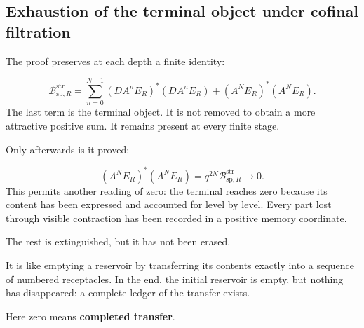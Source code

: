 \subsection{Exhaustion of the terminal object under cofinal filtration}
The proof preserves at each depth a finite identity:\par
\[
\mathcal B_{\mathrm{sp},R}^{\mathrm{str}}
=
\sum_{n=0}^{N-1}
(DA^nE_R)^*(DA^nE_R)
+
(A^NE_R)^*(A^NE_R).
\]
The last term is the terminal object. It is not removed to obtain a more attractive positive sum. It remains present at every finite stage.\par
Only afterwards is it proved:\par
\[
(A^NE_R)^*(A^NE_R)
=
q^{2N}
\mathcal B_{\mathrm{sp},R}^{\mathrm{str}}
\longrightarrow0.
\]
This permits another reading of zero: the terminal reaches zero because its content has been expressed and accounted for level by level. Every part lost through visible contraction has been recorded in a positive memory coordinate.\par
The rest is extinguished, but it has not been erased.\par
It is like emptying a reservoir by transferring its contents exactly into a sequence of numbered receptacles. In the end, the initial reservoir is empty, but nothing has disappeared: a complete ledger of the transfer exists.\par
Here zero means \textbf{completed transfer}.\par
{}

